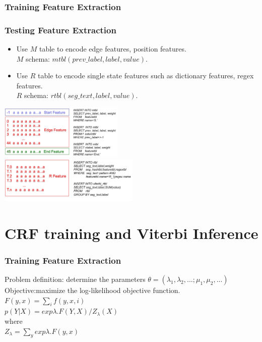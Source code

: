 \documentclass{beamer}
\begin{document}
\begin{frame}
  \frametitle{Training Feature Extraction}
\end{frame}


\begin{frame}
  \frametitle{Testing Feature Extraction}
  \begin{itemize}
  \item Use $M$ table to encode edge features, position features. \\
  $M$ schema: $mtbl(prev\_label,label,value)$.
  \item Use $R$ table to encode single state features such as dictionary features, regex features.\\ 
  $R$ schema: $rtbl(seg\_text,label,value)$. \\
  \end{itemize}
  \includegraphics[height=7.02em]{m.png}\\
  \includegraphics[height=5.85em]{r.png}\\
\end{frame}

\section{CRF training and Viterbi Inference}
\begin{frame}
  \frametitle{Training Feature Extraction}
  Problem definition: determine the parameters $\theta=(\lambda_1,\lambda_2,...;\mu_1,\mu_2,...)$\\
  Objective:maximize the log-likelihood objective function.\\
  $F(y,x)=\sum_i{f(y,x,i)}$\\
  $p(Y|X)=exp\lambda.F(Y,X)/Z_\lambda(X)$\\
  where\\
  $Z_\lambda=\sum_y{exp\lambda.F(y,x)}$
\end{frame}
\end{document}
